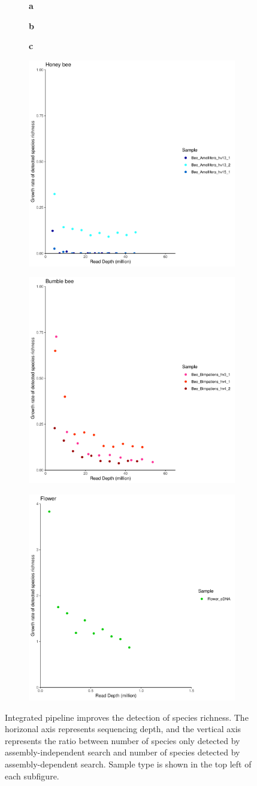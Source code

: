 \documentclass[11pt]{article}
\begin{document}
      \begin{figure}[H]
        \begin{subfigure}
          \centering
          \textbf{a}
        \end{subfigure}
        \hspace{0.32\linewidth}
        \begin{subfigure}
          \centering
          \textbf{b}
        \end{subfigure}
        \hspace{0.32\linewidth}
        \begin{subfigure}
          \centering
          \textbf{c}
        \end{subfigure}
        \newline
        \hfill
        \begin{subfigure}
          \centering
          \includegraphics[width=0.3\linewidth,height=0.3\linewidth]{../Figures/ExtraSpecies_Honey.pdf}
        \end{subfigure}
        \hfill
        \begin{subfigure}
          \centering
          \includegraphics[width=0.3\linewidth,height=0.3\linewidth]{../Figures/ExtraSpecies_Bumble.pdf}
        \end{subfigure}
        \hfill
        \begin{subfigure}
          \centering
          \includegraphics[width=0.3\linewidth,height=0.3\linewidth]{../Figures/ExtraSpecies_Flower.pdf}
        \end{subfigure}
        \caption{Integrated pipeline improves the detection of species richness. 
        The horizonal axis represents sequencing depth, and the vertical axis represents the ratio between number of species only detected by assembly-independent search and number of species detected by assembly-dependent search. 
        Sample type is shown in the top left of each subfigure.}
        \label{CompareSensitivity}
        \end{figure}
\end{document}

